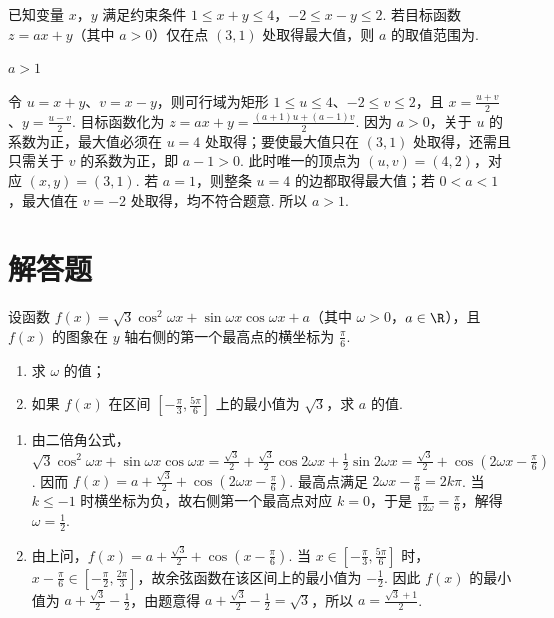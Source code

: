 \begin{problem}
已知变量 \(x\)，\(y\) 满足约束条件 \(1 \leqslant x + y \leqslant 4\)，\(-2 \leqslant x - y \leqslant 2\). 若目标函数 \(z = ax + y\)（其中 \(a > 0\)）仅在点 \((3,1)\) 处取得最大值，则 \(a\) 的取值范围为\fillinblank{}.
\end{problem}

\begin{answer}
\(a>1\)
\end{answer}

\begin{solution}
令 \(u=x+y\)、\(v=x-y\)，则可行域为矩形 \(1\leqslant u\leqslant4\)、\(-2\leqslant v\leqslant2\)，且 \(x=\frac{u+v}{2}\)、\(y=\frac{u-v}{2}\). 目标函数化为 \(z=ax+y=\frac{(a+1)u+(a-1)v}{2}\). 因为 \(a>0\)，关于 \(u\) 的系数为正，最大值必须在 \(u=4\) 处取得；要使最大值只在 \((3,1)\) 处取得，还需且只需关于 \(v\) 的系数为正，即 \(a-1>0\). 此时唯一的顶点为 \((u,v)=(4,2)\)，对应 \((x,y)=(3,1)\). 若 \(a=1\)，则整条 \(u=4\) 的边都取得最大值；若 \(0<a<1\)，最大值在 \(v=-2\) 处取得，均不符合题意. 所以 \(a>1\).
\end{solution}

\section{解答题}
\begin{problem}
设函数 \(f(x) = \sqrt{3} \cos^2 \omega x + \sin \omega x \cos \omega x + a\)（其中 \(\omega > 0\)，\(a \in \R\)），且 \(f(x)\) 的图象在 \(y\) 轴右侧的第一个最高点的横坐标为 \(\frac{\pi}{6}\).
\begin{enumerate}
\item 求 \(\omega\) 的值；
\item 如果 \(f(x)\) 在区间 \(\left[-\frac{\pi}{3}, \frac{5\pi}{6}\right]\) 上的最小值为 \(\sqrt{3}\)，求 \(a\) 的值.
\end{enumerate}
\end{problem}

\begin{solution}
\begin{enumerate}
\item 由二倍角公式，\(\sqrt3\cos^{2}\omega x+\sin\omega x\cos\omega x=\frac{\sqrt3}{2}+\frac{\sqrt3}{2}\cos2\omega x+\frac12\sin2\omega x=\frac{\sqrt3}{2}+\cos\left(2\omega x-\frac\pi6\right)\). 因而 \(f(x)=a+\frac{\sqrt3}{2}+\cos\left(2\omega x-\frac\pi6\right)\). 最高点满足 \(2\omega x-\frac\pi6=2k\pi\). 当 \(k\leqslant-1\) 时横坐标为负，故右侧第一个最高点对应 \(k=0\)，于是 \(\frac{\pi}{12\omega}=\frac\pi6\)，解得 \(\omega=\frac12\).
\item 由上问，\(f(x)=a+\frac{\sqrt3}{2}+\cos\left(x-\frac\pi6\right)\). 当 \(x\in\left[-\frac\pi3,\frac{5\pi}{6}\right]\) 时，\(x-\frac\pi6\in\left[-\frac\pi2,\frac{2\pi}{3}\right]\)，故余弦函数在该区间上的最小值为 \(-\frac12\). 因此 \(f(x)\) 的最小值为 \(a+\frac{\sqrt3}{2}-\frac12\)，由题意得 \(a+\frac{\sqrt3}{2}-\frac12=\sqrt3\)，所以 \(a=\frac{\sqrt3+1}{2}\).
\end{enumerate}
\end{solution}

